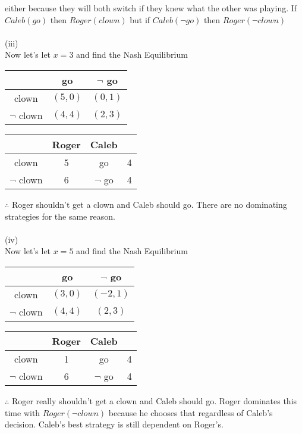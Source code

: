 \documentclass[12pt,letter]{article}
\begin{document}
either because they will both switch if they knew what the other was playing.
If $Caleb(go)$ then $Roger(clown)$ but if $Caleb(\neg go)$ then $Roger(\neg clown)$
\\
\\
(iii)\\
Now let's let $x=3$ and find the Nash Equilibrium
\begin{figure*}[h!]
\centering
\begin{tabular}{|c|c|c|}
	\hline
	& go & $\neg$ go\\
	\hline
	clown & $(5,0)$ & $(0,1)$\\
	\hline
	$\neg$ clown & $(4,4)$ & $(2,3)$\\
	\hline
\end{tabular}
\end{figure*}
\begin{figure*}[h!]
\centering
\begin{tabular}{c c|c c}
	& Roger & Caleb\\
	\hline
	clown & 5 & go & 4\\
	$\neg$ clown & 6 & $\neg$ go & 4
\end{tabular}
\end{figure*}
\FloatBarrier
$\therefore$ Roger shouldn't get a clown and Caleb should go. There are no 
dominating strategies for the same reason.
\\
\\
(iv)\\
Now let's let $x=5$ and find the Nash Equilibrium
\begin{figure*}[h!]
\centering
\begin{tabular}{|c|c|c|}
	\hline
	& go & $\neg$ go\\
	\hline
	clown & $(3,0)$ & $(-2,1)$\\
	\hline
	$\neg$ clown & $(4,4)$ & $(2,3)$\\
	\hline
\end{tabular}
\end{figure*}
\begin{figure*}[h!]
\centering
\begin{tabular}{c c|c c}
	& Roger & Caleb\\
	\hline
	clown & 1 & go & 4\\
	$\neg$ clown & 6 & $\neg$ go & 4
\end{tabular}
\end{figure*}
\FloatBarrier
$\therefore$ Roger really shouldn't get a clown and Caleb should go. Roger 
dominates this time with $Roger(\neg clown)$ because he chooses that regardless
of Caleb's decision. Caleb's best strategy is still dependent on Roger's. 
\end{document}
